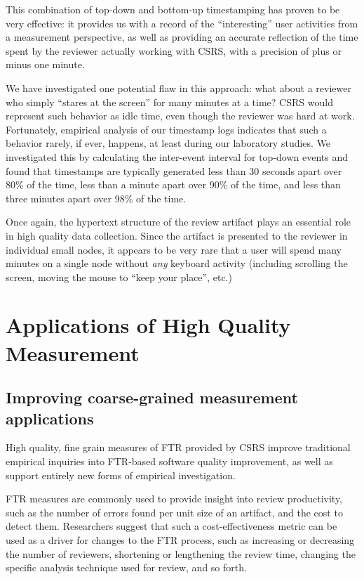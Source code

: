 This combination of top-down and bottom-up timestamping has proven to be very
effective: it provides us with a record of the ``interesting'' user
activities from a measurement perspective, as well as providing an accurate
reflection of the time spent by the reviewer actually working with CSRS,
with a precision of plus or minus one minute. 

We have investigated one potential flaw in this approach: what about a
reviewer who simply ``stares at the screen'' for many minutes at a time?
CSRS would represent such behavior as idle time, even though the reviewer
was hard at work.  Fortunately, empirical analysis of our timestamp logs
indicates that such a behavior rarely, if ever, happens, at least during
our laboratory studies.  We investigated this by calculating the
inter-event interval for top-down events and found that timestamps are
typically generated less than 30 seconds apart over 80\% of the time, less
than a minute apart over 90\% of the time, and less than three minutes
apart over 98\% of the time.

Once again, the hypertext structure of the review artifact plays an
essential role in high quality data collection. Since the artifact is
presented to the reviewer in individual small nodes, it appears to be very
rare that a user will spend many minutes on a single node without {\em any}
keyboard activity (including scrolling the screen, moving the mouse to
``keep your place'', etc.)

\section{Applications of High Quality Measurement}
\label{sec:applications}

\subsection{Improving coarse-grained measurement applications}

High quality, fine grain measures of FTR provided by CSRS
improve traditional empirical inquiries into FTR-based software
quality improvement, as well as support entirely new forms of empirical
investigation.

FTR measures are commonly used to provide insight into review productivity,
such as the number of errors found per unit size of an artifact, and the
cost to detect them.  Researchers suggest that such a cost-effectiveness
metric can be used as a driver for changes to the FTR process, such as
increasing or decreasing the number of reviewers, shortening or lengthening
the review time, changing the specific analysis technique used for review,
and so forth.

